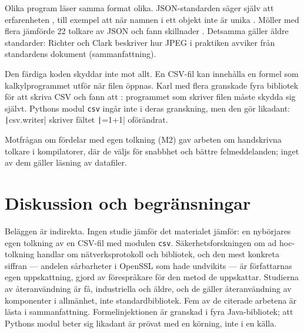 Olika program läser samma format olika.  JSON-standarden säger själv att
erfarenheten , till exempel att när namnen i ett objekt inte är unika
.  Möller med flera jämförde 22 tolkare av JSON
och fann skillnader .  Detsamma gäller
äldre standarder: Richter och Clark beskriver hur JPEG i praktiken
avviker från standardens dokument\autocite{Richter2018JPEG}
(sammanfattning).

Den färdiga koden skyddar inte mot allt.  En CSV-fil kan innehålla en
formel som kalkylprogrammet utför när filen öppnas.  Karl med flera
granskade fyra bibliotek för att skriva CSV och fann att
: programmet som skriver filen måste skydda sig
självt.  Pythons modul \texttt{csv} ingår inte i deras
granskning, men den gör likadant: \texttt|csv.writer| skriver
fältet \texttt|=1+1| oförändrat.

Motfrågan om fördelar med egen tolkning (M2) gav arbeten om
handskrivna tolkare i kompilatorer, där de väljs för snabbhet och bättre
felmeddelanden; inget av dem gäller läsning av datafiler.

\section{Diskussion och begränsningar}
\label{sec:sf-diskussion}

Beläggen är indirekta.  Ingen studie jämför det materialet jämför: en
nybörjares egen tolkning av en CSV-fil med modulen
\texttt{csv}.  Säkerhetsforskningen om ad hoc-tolkning
handlar om nätverksprotokoll och bibliotek, och den mest konkreta
siffran --- andelen sårbarheter i OpenSSL som hade undvikits --- är
författarnas egen uppskattning, gjord av förespråkare för den metod de
uppskattar.  Studierna av återanvändning är få, industriella och äldre,
och de gäller återanvändning av komponenter i allmänhet, inte
standardbibliotek.  Fem av de citerade arbetena är lästa i
sammanfattning.  Formelinjektionen är granskad i fyra Java-bibliotek;
att Pythons modul beter sig likadant är prövat med en körning, inte i
en källa.

